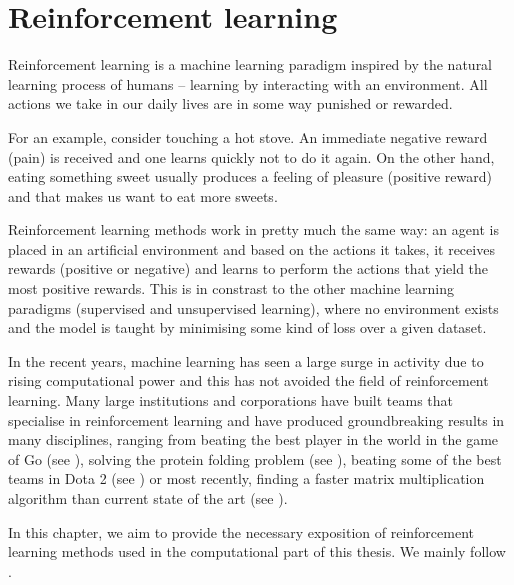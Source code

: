 \chapter{Reinforcement learning}
\label{chapter3}
Reinforcement learning is a machine learning paradigm inspired by the natural learning process of humans -- learning by interacting with an environment. All actions we take in our daily lives are in some way punished or rewarded. 
	
For an example, consider touching a hot stove. An immediate negative reward (pain) is received and one learns quickly not to do it again. On the other hand, eating something sweet usually produces a feeling of pleasure (positive reward) and that makes us want to eat more sweets. 

Reinforcement learning methods work in pretty much the same way: an agent is placed in an artificial environment and based on the actions it takes, it receives rewards (positive or negative) and learns to perform the actions that yield the most positive rewards. This is in constrast to the other machine learning paradigms (supervised and unsupervised learning), where no environment exists and the model is taught by minimising some kind of loss over a given dataset. 

In the recent years, machine learning has seen a large surge in activity due to rising computational power and this has not avoided the field of reinforcement learning. Many large institutions and corporations have built teams that specialise in reinforcement learning and have produced groundbreaking results in many disciplines, ranging from beating the best player in the world in the game of Go (see \cite{alphago_paper}), solving the protein folding problem (see \cite{alphafold}), beating some of the best teams in Dota 2 (see \cite{openaifive}) or most recently, finding a faster matrix multiplication algorithm than current state of the art (see \cite{matrix_multiplication}).

In this chapter, we aim to provide the necessary exposition of reinforcement learning methods used in the computational part of this thesis. We mainly follow \cite{sutton2018reinforcement}.

